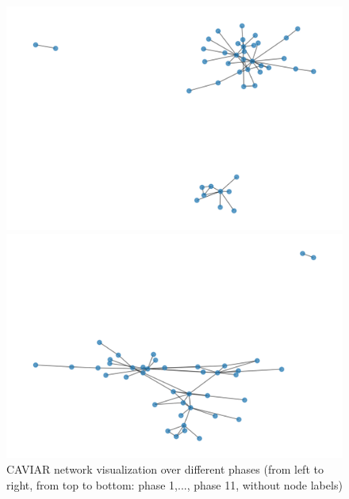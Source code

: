 \begin{figure}[htbp]
\begin{minipage}{.24\textwidth}
	\end{minipage}
	\begin{minipage}{.24\textwidth}
		\centering
		\includegraphics[width=1\linewidth]{problem_02/network_phase10}
	\end{minipage}
	\begin{minipage}{.24\textwidth}
		\centering
		\includegraphics[width=1\linewidth]{problem_02/network_phase11}
	\end{minipage}
	\caption{CAVIAR network visualization over different phases (from left to right, from top to bottom: phase 1,..., phase 11, without node labels)}
	\label{fig:network_visualization}
\end{figure}

